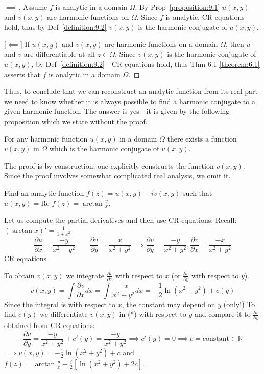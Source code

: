 \begin{proof} [$\implies$] Assume $f$ is analytic in a domain $\Omega$. By Prop~\ref{proposition:9.1}
$u(x,y)$ and $v(x,y)$ are harmonic functions on $\Omega$. Since $f$ is analytic, CR equations hold, thus by Def~\ref{definition:9.2} $v(x,y)$ is the harmonic conjugate of $u(x,y)$.

[$\impliedby$] If $u(x,y)$ and $v(x,y)$ are harmonic functions on a domain $\Omega$, then $u$ and $v$ are differentiable at all $z \in \Omega$. Since $v(x,y)$ is the harmonic conjugate of $u(x,y)$, 
by Def~\ref{definition:9.2} - CR equations hold, 
thus Thm 6.1 \ref{theorem:6.1} asserts that $f$ is analytic in a domain $\Omega$.
\end{proof}

Thus, to conclude that we can reconstruct an analytic function from its real part we need to know whether it is always possible to find a harmonic conjugate to a given harmonic function. The answer is yes - it is given by the following proposition which we state without the proof.

\begin{proposition}\label{proposition:9.3} For any harmonic function $u(x,y)$ in a domain $\Omega$ there exists a function $v(x,y)$ in $\Omega$ which is the harmonic conjugate of $u(x,y)$.

The proof is by construction: one explicitly constructs the function $v(x,y)$. Since the proof involves somewhat complicated real analysis, we omit it.
\end{proposition}

\begin{example}\label{example:11.3} Find an analytic function $f(z) = u(x,y) + iv(x,y)$ such that $u(x,y) = \text{Re } f(z) = \arctan \frac{y}{x}$.

\begin{soln} Let us compute the partial derivatives and then use CR equations: Recall: $(\arctan x)' = \frac{1}{1 + x^2}$
\[ \frac{\partial u}{\partial x} = \frac{-y}{x^2 + y^2} \qquad \frac{\partial u}{\partial y} = \frac{x}{x^2 + y^2} \implies \frac{\partial v}{\partial y} = \frac{-y}{x^2 + y^2}, \frac{\partial v}{\partial x} = \frac{-x}{x^2 + y^2} \]
CR equations

To obtain $v(x,y)$ we integrate $\frac{\partial v}{\partial x}$ with respect to $x$ (or $\frac{\partial v}{\partial y}$ with respect to $y$).
\[ v(x,y) = \int \frac{\partial v}{\partial x} dx = \int \frac{-x}{x^2 + y^2} dx = -\frac{1}{2} \ln(x^2 + y^2) + c(y) \]
Since the integral is with respect to $x$, the constant may depend on $y$ (only!) To find $c(y)$ we differentiate $v(x,y)$ in (*) with respect to $y$ and compare it to $\frac{\partial v}{\partial y}$ obtained from CR equations:
\[ \frac{\partial v}{\partial y} = \frac{-y}{x^2 + y^2} + c'(y) = \frac{-y}{x^2 + y^2} \implies c'(y) = 0 \implies c = \text{constant} \in \mathbb{R} \]
$\implies v(x,y) = -\frac{1}{2}\ln(x^2 + y^2) + c$ and $f(z) = \arctan \frac{y}{x} - \frac{i}{2}[\ln(x^2 + y^2) + 2c]$.

\end{soln}
\end{example}